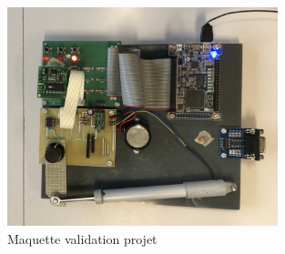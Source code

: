 \begin{figure}[h]
  \begin{center}
    \includegraphics[width=0.7\textwidth]{images/maquette.jpg}
    \caption{Maquette validation projet}
  \end{center}
\end{figure}